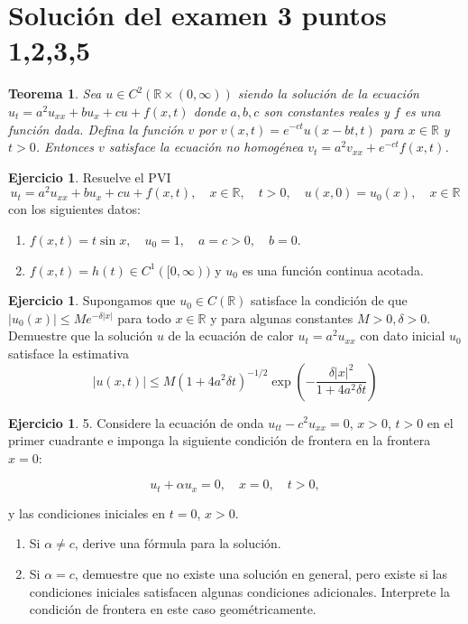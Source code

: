 \documentclass{article}
\theoremstyle{plain}
\newtheorem{teo}[proposición]{Teorema}
\theoremstyle{definition}
\newtheorem{ex}[proposición]{Ejercicio}
\begin{document}
\section*{Solución del examen 3 puntos 1,2,3,5}
\date{24 de octubre 2023}
\begin{teo}
    Sea \( u \in C^2(\mathbb{R} \times (0, \infty)) \) siendo la solución de la ecuación \( u_t = a^2 u_{xx} + bu_x + cu + f(x, t) \) donde \( a, b, c \) son constantes reales y \( f \) es una función dada. Defina la función \( v \) por \( v(x, t) = e^{-ct} u(x - bt, t) \) para \( x \in \mathbb{R} \) y \( t > 0 \). Entonces \( v \) satisface la ecuación no homogénea \( v_t = a^2 v_{xx} + e^{-ct} f(x, t) \).
    
\end{teo}

\begin{ex}
    Resuelve el PVI
    \[
    u_t = a^2 u_{xx} + bu_x + cu + f(x, t), \quad x \in \mathbb{R}, \quad t > 0, \quad u(x, 0) = u_0(x), \quad x \in \mathbb{R}
    \]
    con los siguientes datos:
    \begin{enumerate}
        \item \( f(x, t) = t \sin x, \quad u_0 = 1, \quad a = c > 0, \quad b = 0 \).
        \item \( f(x, t) = h(t) \in C^1([0, \infty)) \) y \( u_0 \) es una función continua acotada.
    \end{enumerate}
\end{ex}




\begin{ex}
     Supongamos que \( u_0 \in C(\mathbb{R}) \) satisface la condición de que \( |u_0(x)| \leq M e^{-\delta|x|} \) para todo \( x \in \mathbb{R} \) y para algunas constantes \( M > 0, \delta > 0 \). Demuestre que la solución \( u \) de la ecuación de calor \( u_t = a^2 u_{xx} \) con dato inicial \( u_0 \) satisface la estimativa
\[
|u(x, t)| \leq M(1 + 4a^2 \delta t)^{-1/2} \exp \left( -\frac{\delta |x|^2}{1 + 4a^2 \delta t} \right)
\]

\end{ex}


\begin{ex}
5. Considere la ecuación de onda \( u_{tt} - c^2 u_{xx} = 0 \), \( x > 0 \), \( t > 0 \) en el primer cuadrante e imponga la siguiente condición de frontera en la frontera \( x = 0 \):

\[
u_t + \alpha u_x = 0, \quad x = 0, \quad t > 0,
\]

y las condiciones iniciales en \( t = 0 \), \( x > 0 \).

\begin{enumerate}
    \item Si \( \alpha \neq c \), derive una fórmula para la solución.
    \item Si \( \alpha = c \), demuestre que no existe una solución en general, pero existe si las condiciones iniciales satisfacen algunas condiciones adicionales. Interprete la condición de frontera en este caso geométricamente.
\end{enumerate}

\end{ex}
\end{document}
